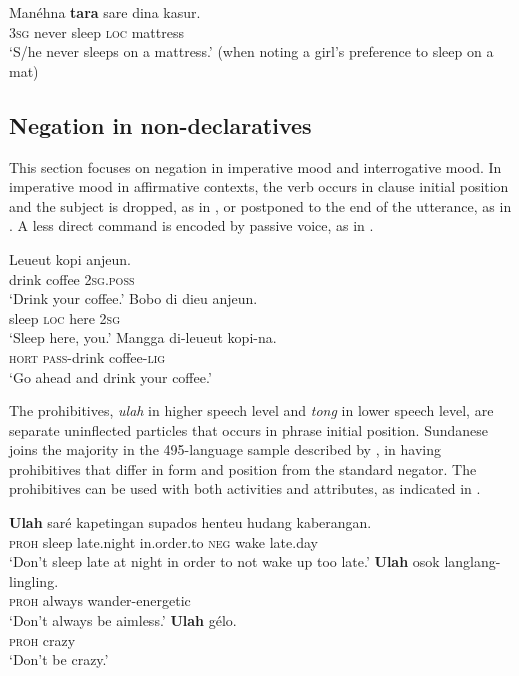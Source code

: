 \documentclass[output=paper]{langscibook}
\begin{document}
\ea\label{ex:sun:10} 
    \gll  Manéhna \textbf{tara} sare dina kasur.\\ 
          3\textsc{sg} never sleep \textsc{loc} mattress\\
    \glt ‘S/he never sleeps on a mattress.’ (when noting a girl’s preference to sleep on a mat) \citep[92]{Butters2021}
\z 
\subsection{Negation in non-declaratives}\label{sec:sun:2.2}

This section focuses on negation in imperative mood and interrogative mood. In imperative mood in affirmative contexts, the verb occurs in clause initial position and the subject is dropped, as in , or postponed to the end of the utterance, as in . A less direct command is encoded by passive voice, as in . 

\ea\label{ex:sun:11}
    \ea\label{ex:sun:11a}
        \gll  Leueut kopi anjeun.\\ 
              drink coffee 2\textsc{sg}.\textsc{poss}\\
        \glt ‘Drink your coffee.’
    \ex\label{ex:sun:11b}
        \gll  Bobo di dieu anjeun.\\
              sleep \textsc{loc} here 2\textsc{sg}\\
        \glt ‘Sleep here, you.’
    \ex\label{ex:sun:11c}
        \gll  Mangga di-leueut kopi-na. \\
              \textsc{hort} \textsc{pass}{}-drink coffee-\textsc{lig}\\
        \glt ‘Go ahead and drink your coffee.’ \citep[137]{Butters2021}
    \z
\z 

The prohibitives, \textit{ulah} in higher speech level and \textit{tong} in lower speech level, are separate uninflected particles that occurs in phrase initial position. Sundanese joins the majority in the 495-language sample described by \citet{AuweraEtAl2013}, in having prohibitives that differ in form and position from the standard negator. The prohibitives can be used with both activities and attributes, as indicated in .

\ea\label{ex:sun:12}
    \ea\label{ex:sun:12a}
        \gll  \textbf{Ulah} saré kapetingan supados henteu hudang kaberangan.\\ 
              \textsc{proh} sleep late.night in.order.to \textsc{neg} wake late.day \\
        \glt ‘Don’t sleep late at night in order to not wake up too late.’
    \ex\label{ex:sun:12b}
        \gll  \textbf{Ulah} osok langlang-lingling.\\
              \textsc{proh} always wander-energetic \\
        \glt ‘Don’t always be aimless.’
    \ex\label{ex:sun:12c}
        \gll  \textbf{Ulah} gélo. \\
              \textsc{proh} crazy\\
        \glt ‘Don’t be crazy.’ \citep[137]{Butters2021}
    \z
\z 
\end{document}

